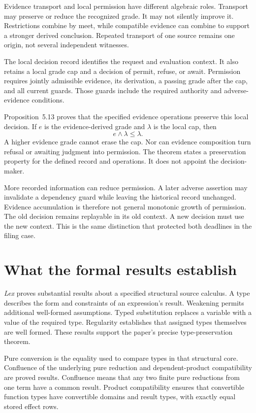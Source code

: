 \documentclass{momentum}
\begin{document}
Evidence transport and local permission have different algebraic roles. Transport may preserve or reduce the recognized grade. It may not silently improve it. Restrictions combine by meet, while compatible evidence can combine to support a stronger derived conclusion. Repeated transport of one source remains one origin, not several independent witnesses. \cite[Sections~5.1--5.5]{composes}

The local decision record identifies the request and evaluation context. It also retains a local grade cap and a decision of permit, refuse, or await. Permission requires jointly admissible evidence, its derivation, a passing grade after the cap, and all current guards. Those guards include the required authority and adverse-evidence conditions.

Proposition~5.13 proves that the specified evidence operations preserve this local decision. If $e$ is the evidence-derived grade and $\lambda$ is the local cap, then
\[
e\wedge\lambda\leq\lambda.
\]
A higher evidence grade cannot erase the cap. Nor can evidence composition turn refusal or awaiting judgment into permission. The theorem states a preservation property for the defined record and operations. It does not appoint the decision-maker. \cite[Section~5.5, Recognition preserves reserved local decisions]{composes}

More recorded information can reduce permission. A later adverse assertion may invalidate a dependency guard while leaving the historical record unchanged. Evidence accumulation is therefore not general monotonic growth of permission. The old decision remains replayable in its old context. A new decision must use the new context. This is the same distinction that protected both deadlines in the filing case.

\section{What the formal results establish}

\emph{Lex} proves substantial results about a specified structural source calculus. A type describes the form and constraints of an expression's result. Weakening permits additional well-formed assumptions. Typed substitution replaces a variable with a value of the required type. Regularity establishes that assigned types themselves are well formed. These results support the paper's precise type-preservation theorem. \cite[Section~4.2]{lex}

Pure conversion is the equality used to compare types in that structural core. Confluence of the underlying pure reduction and dependent-product compatibility are proved results. Confluence means that any two finite pure reductions from one term have a common result. Product compatibility ensures that convertible function types have convertible domains and result types, with exactly equal stored effect rows.
\end{document}
